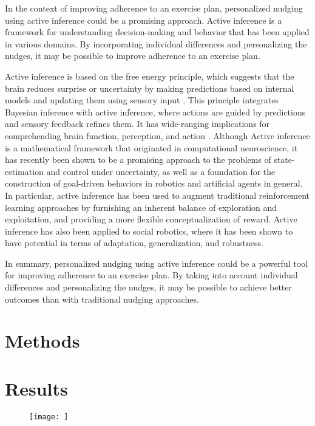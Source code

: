 \documentclass[manuscript,screen,review]{acmart}
\begin{document}
In the context of improving adherence to an exercise plan, personalized nudging using active inference could be a promising approach. Active inference is a framework for understanding decision-making and behavior that has been applied in various domains. By incorporating individual differences and personalizing the nudges, it may be possible to improve adherence to an exercise plan.

Active inference is based on the free energy principle, which suggests that the brain reduces surprise or uncertainty
 by making predictions based on internal models and updating them using sensory input \cite{mann2022free}. This
 principle integrates  Bayesian inference with active inference, where actions are guided by predictions and sensory feedback refines them.
  It has wide-ranging implications for comprehending brain function, perception, and action
  \cite{bruineberg2018anticipating}. Although Active inference is a mathematical framework that originated in
  computational neuroscience, it has recently been shown to be a promising approach to the problems of
  state-estimation and control under uncertainty, as well as a foundation for the construction of goal-driven
  behaviors in robotics and artificial agents in general\cite{lanillos2021active}. In particular, active inference
  has been used to augment traditional reinforcement learning approaches by furnishing an inherent balance of
  exploration and exploitation, and providing a more flexible conceptualization of
  reward\cite{tschantz2020reinforcement}. Active inference has also been applied to social robotics, where it has
  been shown to have potential in terms of adaptation, generalization, and robustness\cite{da2022active}.

In summary, personalized nudging using active inference could be a powerful tool for improving adherence to an exercise plan. By taking into account individual differences and personalizing the nudges, it may be possible to achieve better outcomes than with traditional nudging approaches.

\section{Methods}

\section{Results}

\begin{figure}[h]
  \centering
  \texttt{[image: ]}
  \caption{}
  \Description{}
\end{figure}
\end{document}
